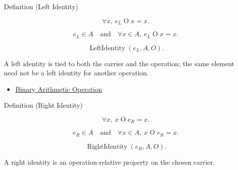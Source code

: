 \begin{definitionbox}{Definition (Left Identity)}
\begin{definition}
\label{def:left-identity}
\[
\forall x,\ e_L\mathbin{O}x=x.
\]
\end{definition}
\end{definitionbox}

\begin{remark*}
\[
e_L\in A
\quad\text{and}\quad
\forall x\in A,\ e_L\mathbin{O}x=x.
\]
\end{remark*}

\begin{remark*}
\[
\operatorname{LeftIdentity}(e_L,A,O).
\]
\end{remark*}

\begin{remark*}[Interpretation]
A left identity is tied to both the carrier and the operation; the same element
need not be a left identity for another operation.
\end{remark*}

\begin{dependencies}
\begin{itemize}
  \item \hyperref[def:binary-arithmetic-operation]{Binary Arithmetic Operation}
\end{itemize}
\end{dependencies}

\begin{definitionbox}{Definition (Right Identity)}
\begin{definition}
\label{def:right-identity}
\[
\forall x,\ x\mathbin{O}e_R=x.
\]
\end{definition}
\end{definitionbox}

\begin{remark*}
\[
e_R\in A
\quad\text{and}\quad
\forall x\in A,\ x\mathbin{O}e_R=x.
\]
\end{remark*}

\begin{remark*}
\[
\operatorname{RightIdentity}(e_R,A,O).
\]
\end{remark*}

\begin{remark*}[Interpretation]
A right identity is an operation-relative property on the chosen carrier.
\end{remark*}

